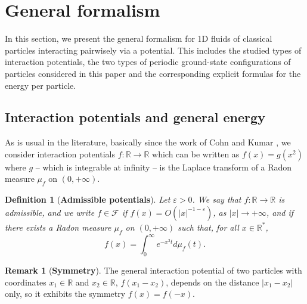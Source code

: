 \documentclass[12pt]{iopart}
\newtheorem{defi}{Definition}[section]
\theoremstyle{definition}
\newtheorem{remark}[thm]{Remark}
\newcommand{\R}{\mathbb R}
\begin{document}
\renewcommand{\theequation}{2.\arabic{equation}}
\setcounter{equation}{0}

\section{General formalism} \label{Sec2}
In this section, we present the general formalism for 1D fluids of classical
particles interacting pairwisely via a potential.
This includes the studied types of interaction potentials, the two types
of periodic ground-state configurations of particles considered in this
paper and the corresponding explicit formulas for the energy per particle.

\subsection{Interaction potentials and general energy} \label{Sec20}

As is usual in the literature, basically since the work of Cohn and Kumar
\cite{Cohn07}, we consider interaction potentials
$f:\mathbb{R}\to \mathbb{R}$ which can be written as $f(x)=g(x^2)$
where $g$ -- which is integrable at infinity -- is the Laplace transform of
a Radon measure $\mu_f$ on $(0,+\infty)$.
\begin{defi}[\textbf{Admissible potentials}]
Let $\varepsilon>0$. We say that $f:\R\to \R$ is admissible, and we write $f\in \mathcal{F}$
if $f(x)=O(|x|^{-1-\varepsilon})$, as $|x|\to +\infty$, and if there exists a Radon measure $\mu_f$ on $(0,+\infty)$ such that, for all $ x\in \R^*$,
\begin{equation} \label{intpot}
f(x) = \int_0^{\infty} e^{-x^2 t} d\mu_f(t).
\end{equation}
\end{defi}
\begin{remark}[\textbf{Symmetry}]
The general interaction potential of two particles with coordinates
$x_1\in \R$ and $x_2\in \R$, $f(x_1-x_2)$, depends on the distance
$\vert x_1-x_2\vert$ only, so it exhibits the symmetry $f(x)=f(-x)$.
\end{remark}
\end{document}
